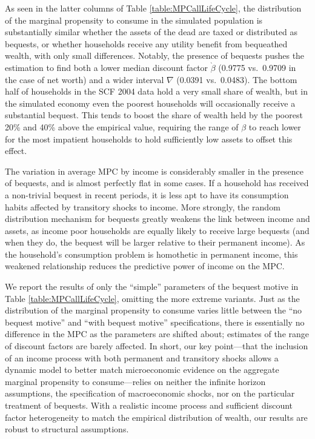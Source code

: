 \documentclass[11pt,a4paper,pdftex]{article}\usepackage[pdftex]{graphicx}\usepackage{epstopdf} \usepackage[pdftex]{hyperref}
\newcommand{\Discount}{\ensuremath{\beta}}
\begin{document}
As seen in the latter columns of Table \ref{table:MPCallLifeCycle}, the distribution of the marginal propensity to consume in the simulated population is substantially similar whether the assets of the dead are taxed or distributed as bequests, or whether households receive any utility benefit from bequeathed wealth, with only small differences.  Notably, the presence of bequests pushes the estimation to find both a lower median discount factor $\grave{\Discount}$ (0.9775 vs.\ 0.9709 in the case of net worth) and a wider interval $\nabla$ (0.0391 vs.\ 0.0483).  The bottom half of households in the SCF 2004 data hold a very small share of wealth, but in the simulated economy even the poorest households will occasionally receive a substantial bequest.  This tends to boost the share of wealth held by the poorest 20\% and 40\% above the empirical value, requiring the range of $\Discount$ to reach lower for the most impatient households to hold sufficiently low assets to offset this effect.

The variation in average MPC by income is considerably smaller in the presence of bequests, and is almost perfectly flat in some cases.  If a household has received a non-trivial bequest in recent periods, it is less apt to have its consumption habits affected by transitory shocks to income.  More strongly, the random distribution mechanism for bequests greatly weakens the link between income and assets, as income poor households are equally likely to receive large bequests (and when they do, the bequest will be larger relative to their permanent income).  As the household's consumption problem is homothetic in permanent income, this weakened relationship reduces the predictive power of income on the MPC.

We report the results of only the ``simple'' parameters of the bequest motive in Table \ref{table:MPCallLifeCycle}, omitting the more extreme variants.  Just as the distribution of the marginal propensity to consume varies little between the ``no bequest motive'' and ``with bequest motive'' specifications, there is essentially no difference in the MPC as the parameters are shifted about; estimates of the range of discount factors are barely affected.  In short, our key point---that the inclusion of an income process with both permanent and transitory shocks allows a dynamic model to better match microeconomic evidence on the aggregate marginal propensity to consume---relies on neither the infinite horizon assumptions,%
the specification of macroeconomic shocks, nor on the particular treatment of bequests.  With a realistic income process and sufficient discount factor heterogeneity to match the empirical distribution of wealth, our results are robust to structural assumptions.
\end{document}
